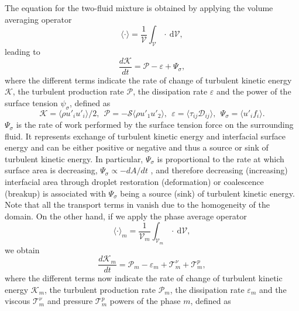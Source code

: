 The equation for the two-fluid mixture is obtained by applying the volume averaging operator
\begin{equation}
\langle \cdot \rangle = \frac{1}{\mathcal{V}} \int_\mathcal{V} \cdot \ \mathrm{d} \mathcal{V},
\end{equation}
leading to
\begin{equation}
\label{eq:tke_both}
\frac{d \mathcal{K}}{d t} = \mathcal{P} - \varepsilon + \Psi_\sigma,
\end{equation}
where the different terms indicate the rate of change of turbulent kinetic energy $\mathcal{K}$, the turbulent production rate $\mathcal{P}$, the dissipation rate $\varepsilon$ and the power of the surface tension $\psi_\sigma$, defined as
\begin{equation}
\mathcal{K} = \langle \rho u'_i u'_i \rangle/2, \ \
\mathcal{P} = -\mathcal{S} \langle \rho u'_1 u'_2 \rangle, \ \
\varepsilon = \langle \tau_{ij} \mathcal{D}_{ij} \rangle, \ \
\Psi_\sigma = \langle u'_i f_i \rangle.
\end{equation}
$\Psi_\sigma$ is the rate of work performed by the surface tension force on the surrounding fluid. It represents exchange of turbulent kinetic energy and interfacial surface energy and can be either positive or negative and thus a source or sink of turbulent kinetic energy. In particular, $\Psi_\sigma$ is proportional to the rate at which surface area is decreasing, \ie $\Psi_\sigma \propto -dA/dt$ \citep{dodd_ferrante_2016a}, and therefore decreasing (increasing) interfacial area through droplet restoration (deformation) or coalescence (breakup) is associated with $\Psi_\sigma$ being a source (sink) of turbulent kinetic energy. Note that all the transport terms in  vanish due to the homogeneity of the domain. On the other hand, if we apply the phase average operator
\begin{equation}
\langle \cdot \rangle_m = \frac{1}{\mathcal{V}_m} \int_{\mathcal{V}_m} \cdot \ \mathrm{d} \mathcal{V},
\end{equation}
we obtain
\begin{equation}
\label{eq:tke_single}
\frac{d \mathcal{K}_m}{d t} = \mathcal{P}_m - \varepsilon_m + \mathcal{T}^\nu_m + \mathcal{T}^p_m,
\end{equation}
where the different terms now indicate  the rate of change of turbulent kinetic energy $\mathcal{K}_m$, the turbulent production rate $\mathcal{P}_m$, the dissipation rate $\varepsilon_m$ and the viscous $\mathcal{T}^\nu_m$ and pressure $\mathcal{T}^p_m$ powers of the phase $m$, defined as

